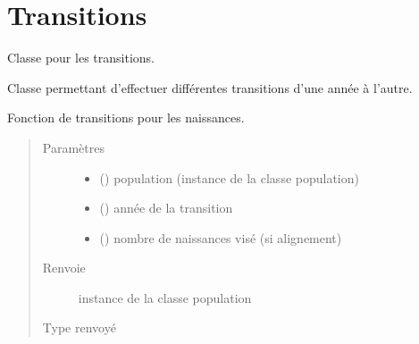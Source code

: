 \documentclass[letterpaper,10pt,french]{sphinxmanual}
\begin{document}
\section{Transitions}
\label{\detokenize{code:transitions}}

\begin{fulllineitems}
\label{\detokenize{code:simgen.update}}
Classe pour les transitions.

Classe permettant d’effectuer différentes transitions d’une année à l’autre.

\begin{fulllineitems}
\label{\detokenize{code:simgen.update.birth}}
Fonction de transitions pour les naissances.
\begin{quote}\begin{description}
\item[{Paramètres}] \leavevmode\begin{itemize}
\item {} 
 ({\hyperref[\detokenize{code:simgen.population}]{}}) \textendash{} population (instance de la classe population)

\item {} 
 () \textendash{} année de la transition

\item {} 
 () \textendash{} nombre de naissances visé (si alignement)

\end{itemize}

\item[{Renvoie}] \leavevmode
instance de la classe population

\item[{Type renvoyé}] \leavevmode
{\hyperref[\detokenize{code:simgen.population}]{}}


\end{description}
\end{quote}
\end{fulllineitems}
\end{fulllineitems}
\end{document}
